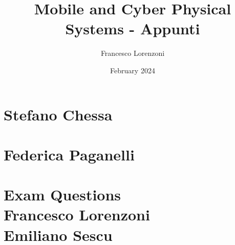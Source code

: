 
\title{Mobile and Cyber Physical Systems - Appunti}
\author{Francesco Lorenzoni}
\date{February 2024}


\usepackage{etoolbox}

\makeatletter
\renewcommand{\l@section}{\@dottedtocline{1}{1.5em}{2.6em}}
\renewcommand{\l@subsection}{\@dottedtocline{2}{2.5em}{3.6em}}
\renewcommand{\l@subsubsection}{\@dottedtocline{3}{3.5em}{4.5em}}
\makeatother

\setcounter{minitocdepth}{4}


\doparttoc[n]
\maketitle
\tableofcontents

\part{Stefano Chessa}
\parttoc















\part{Federica Paganelli}
\parttoc








\part[Exam Questions]{Exam Questions\\[\bigskipamount] 
\large Francesco Lorenzoni\\Emiliano Sescu}
\parttoc




